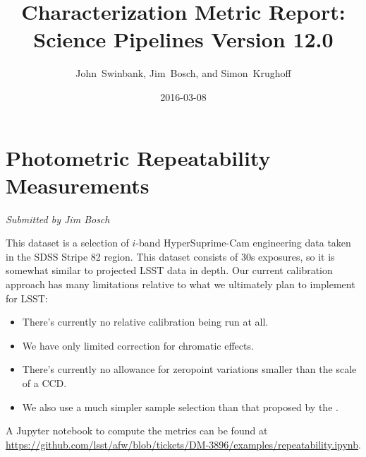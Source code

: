 \documentclass[DM,toc]{lsstdoc}
\title[V12.0 Characterization Report]{Characterization Metric Report: Science Pipelines Version 12.0}
\author{John~Swinbank, Jim~Bosch, and Simon~Krughoff}
\date{2016-03-08}
\begin{document}
\maketitle

\section{Photometric Repeatability
Measurements}\label{photometric-repeatability-measurements}

\emph{Submitted by Jim Bosch}

This dataset is a selection of $i$-band HyperSuprime-Cam
engineering data taken in the SDSS Stripe 82 region. This dataset
consists of 30s exposures, so it is somewhat similar to projected LSST
data in depth. Our current calibration approach has many limitations
relative to what we ultimately plan to implement for LSST:

\begin{itemize}
\item
  There's currently no relative calibration being run at all.
\item
  We have only limited correction for chromatic effects.
\item
  There's currently no allowance for zeropoint variations smaller than
  the scale of a CCD.
\item
  We also use a much simpler sample selection than that proposed by the
  \SRD.
\end{itemize}

A Jupyter notebook to compute the metrics can be found at
\url{https://github.com/lsst/afw/blob/tickets/DM-3896/examples/repeatability.ipynb}.
\end{document}

